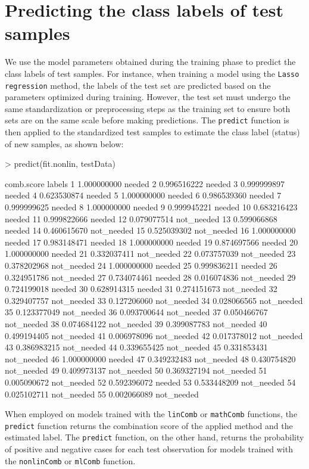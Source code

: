 \documentclass[10pt]{article}
\newcommand{\Rfunction}[1]{\texttt{#1}}
\begin{document}
\section{Predicting the class labels of test samples}
We use the model parameters obtained during the training phase to predict the class labels of test samples. For instance, when training a model using the \texttt{Lasso regression} method, the labels of the test set are predicted based on the parameters optimized during training. However, the test set must undergo the same standardization or preprocessing steps as the training set to ensure both sets are on the same scale before making predictions. The \Rfunction{predict} function is then applied to the standardized test samples to estimate the class label (status) of new samples, as shown below:
\begin{Schunk}
\begin{Sinput}
> predict(fit.nonlin, testData)
\end{Sinput}
\begin{Soutput}
    comb.score     labels
1  1.000000000     needed
2  0.996516222     needed
3  0.999999897     needed
4  0.623530874     needed
5  1.000000000     needed
6  0.986539360     needed
7  0.999999625     needed
8  1.000000000     needed
9  0.999945221     needed
10 0.683216423     needed
11 0.999822666     needed
12 0.079077514 not_needed
13 0.599066868     needed
14 0.460615670 not_needed
15 0.525039302 not_needed
16 1.000000000     needed
17 0.983148471     needed
18 1.000000000     needed
19 0.874697566     needed
20 1.000000000     needed
21 0.332037411 not_needed
22 0.073757039 not_needed
23 0.378202968 not_needed
24 1.000000000     needed
25 0.999836211     needed
26 0.324951786 not_needed
27 0.734074461     needed
28 0.016074836 not_needed
29 0.724199018     needed
30 0.628914315     needed
31 0.274151673 not_needed
32 0.329407757 not_needed
33 0.127206060 not_needed
34 0.028066565 not_needed
35 0.123377049 not_needed
36 0.093700644 not_needed
37 0.050466767 not_needed
38 0.074684122 not_needed
39 0.399087783 not_needed
40 0.499194405 not_needed
41 0.006978096 not_needed
42 0.017378012 not_needed
43 0.386983215 not_needed
44 0.339655425 not_needed
45 0.331853431 not_needed
46 1.000000000     needed
47 0.349232483 not_needed
48 0.430754820 not_needed
49 0.409973137 not_needed
50 0.369327194 not_needed
51 0.005090672 not_needed
52 0.592396072     needed
53 0.533448209 not_needed
54 0.025102711 not_needed
55 0.002066089 not_needed
\end{Soutput}
\end{Schunk}
When employed on models trained with the \Rfunction{linComb} or \Rfunction{mathComb} functions, the \Rfunction{predict} function returns the combination score of the applied method and the estimated label. The \Rfunction{predict} function, on the other hand, returns the probability of positive and negative cases for each test observation for models trained with the \Rfunction{nonlinComb} or \Rfunction{mlComb} function.
\end{document}
